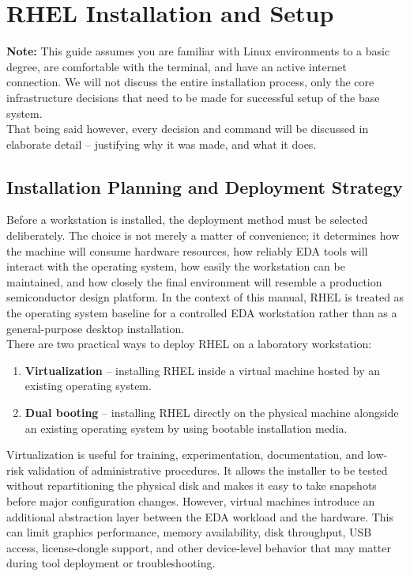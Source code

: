 \chapter{RHEL Installation and Setup}

\begin{tcolorbox}
	\textbf{Note:} This guide assumes you are familiar with Linux environments to a basic degree, are comfortable with the terminal, and have an active internet connection. We will not discuss the entire installation process, only the core infrastructure decisions that need to be made for successful setup of the base system. \\

	That being said however, every decision and command will be discussed in elaborate detail -- justifying why it was made, and what it does.
\end{tcolorbox}


\section{Installation Planning and Deployment Strategy}

Before a workstation is installed, the deployment method must be selected deliberately. The
choice is not merely a matter of convenience; it determines how the machine will consume
hardware resources, how reliably EDA tools will interact with the operating system, how easily
the workstation can be maintained, and how closely the final environment will resemble a
production semiconductor design platform. In the context of this manual, RHEL is treated as the
operating system baseline for a controlled EDA workstation rather than as a general-purpose
desktop installation.\\

There are two practical ways to deploy RHEL on a laboratory workstation:
\begin{enumerate}
	\item \textbf{Virtualization} -- installing RHEL inside a virtual machine hosted by an
	existing operating system.
	\item \textbf{Dual booting} -- installing RHEL directly on the physical machine alongside
	an existing operating system by using bootable installation media.
\end{enumerate} 

Virtualization is useful for training, experimentation, documentation, and low-risk validation
of administrative procedures. It allows the installer to be tested without repartitioning the
physical disk and makes it easy to take snapshots before major configuration changes. However,
virtual machines introduce an additional abstraction layer between the EDA workload and the
hardware. This can limit graphics performance, memory availability, disk throughput, USB access,
license-dongle support, and other device-level behavior that may matter during tool deployment
or troubleshooting.\\

